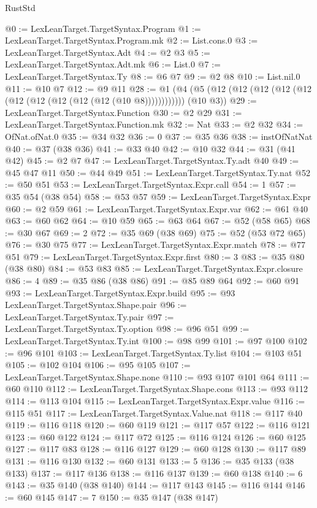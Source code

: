 \begin{lexlean}{RustStd}
\begin{coremodule}
{\begin{coremodule}
{{{{{{{{{{{{{{{{{{{{{{{{{{{{{@0 := LexLeanTarget.TargetSyntax.Program
@1 := LexLeanTarget.TargetSyntax.Program.mk
@2 := List.cons.{0}
@3 := LexLeanTarget.TargetSyntax.Adt
@4 := @2 @3
@5 := LexLeanTarget.TargetSyntax.Adt.mk
@6 := List.{0}
@7 := LexLeanTarget.TargetSyntax.Ty
@8 := @6 @7
@9 := @2 @8
@10 := List.nil.{0}
@11 := @10 @7
@12 := @9 @11
@28 := @1 (@4 (@5 (@12 (@12 (@12 (@12 (@12 (@12 (@12 (@12 (@12 (@12 (@10 @8)))))))))))) (@10 @3))
@29 := LexLeanTarget.TargetSyntax.Function
@30 := @2 @29
@31 := LexLeanTarget.TargetSyntax.Function.mk
@32 := Nat
@33 := @2 @32
@34 := OfNat.ofNat.{0}
@35 := @34 @32
@36 := 0
@37 := @35 @36
@38 := instOfNatNat
@40 := @37 (@38 @36)
@41 := @33 @40
@42 := @10 @32
@44 := @31 (@41 @42)
@45 := @2 @7
@47 := LexLeanTarget.TargetSyntax.Ty.adt @40
@49 := @45 @47 @11
@50 := @44 @49
@51 := LexLeanTarget.TargetSyntax.Ty.nat
@52 := @50 @51
@53 := LexLeanTarget.TargetSyntax.Expr.call
@54 := 1
@57 := @35 @54 (@38 @54)
@58 := @53 @57
@59 := LexLeanTarget.TargetSyntax.Expr
@60 := @2 @59
@61 := LexLeanTarget.TargetSyntax.Expr.var
@62 := @61 @40
@63 := @60 @62
@64 := @10 @59
@65 := @63 @64
@67 := @52 (@58 @65)
@68 := @30 @67
@69 := 2
@72 := @35 @69 (@38 @69)
@75 := @52 (@53 @72 @65)
@76 := @30 @75
@77 := LexLeanTarget.TargetSyntax.Expr.match
@78 := @77 @51
@79 := LexLeanTarget.TargetSyntax.Expr.first
@80 := 3
@83 := @35 @80 (@38 @80)
@84 := @53 @83
@85 := LexLeanTarget.TargetSyntax.Expr.closure
@86 := 4
@89 := @35 @86 (@38 @86)
@91 := @85 @89 @64
@92 := @60 @91
@93 := LexLeanTarget.TargetSyntax.Expr.build
@95 := @93 LexLeanTarget.TargetSyntax.Shape.pair
@96 := LexLeanTarget.TargetSyntax.Ty.pair
@97 := LexLeanTarget.TargetSyntax.Ty.option
@98 := @96 @51
@99 := LexLeanTarget.TargetSyntax.Ty.int
@100 := @98 @99
@101 := @97 @100
@102 := @96 @101
@103 := LexLeanTarget.TargetSyntax.Ty.list
@104 := @103 @51
@105 := @102 @104
@106 := @95 @105
@107 := LexLeanTarget.TargetSyntax.Shape.none
@110 := @93 @107 @101 @64
@111 := @60 @110
@112 := LexLeanTarget.TargetSyntax.Shape.cons
@113 := @93 @112
@114 := @113 @104
@115 := LexLeanTarget.TargetSyntax.Expr.value
@116 := @115 @51
@117 := LexLeanTarget.TargetSyntax.Value.nat
@118 := @117 @40
@119 := @116 @118
@120 := @60 @119
@121 := @117 @57
@122 := @116 @121
@123 := @60 @122
@124 := @117 @72
@125 := @116 @124
@126 := @60 @125
@127 := @117 @83
@128 := @116 @127
@129 := @60 @128
@130 := @117 @89
@131 := @116 @130
@132 := @60 @131
@133 := 5
@136 := @35 @133 (@38 @133)
@137 := @117 @136
@138 := @116 @137
@139 := @60 @138
@140 := 6
@143 := @35 @140 (@38 @140)
@144 := @117 @143
@145 := @116 @144
@146 := @60 @145
@147 := 7
@150 := @35 @147 (@38 @147)
}}}}}}}}}}}}}}}}}}}}}}}}}}}}}
\end{coremodule}}
\end{coremodule}
\end{lexlean}
